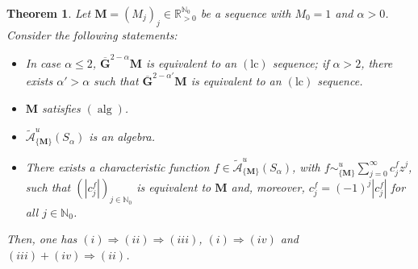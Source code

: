\documentclass[11pt,a4paper]{article}
\theoremstyle{plain}
\newtheorem{theorem}[proposition]{Theorem}
\theoremstyle{definition}
\newcommand{\RR}{\mathbb{R}}
\newcommand{\NN}{\mathbb{N}}
\newcommand{\M}{\mathbf{M}}
\newcommand{\G}{\mathbf{G}}
\let\on=\operatorname
\def\a{\alpha}
\begin{document}
\begin{theorem}\label{thm.stablepointwiseprop}
Let $\M=(M_j)_j\in\RR_{>0}^{\NN_0}$ be a sequence with $M_0=1$ and $\alpha>0$. Consider the following statements:
\begin{itemize}
    \item[(i)] In case $\alpha\leq 2$, $\overline{\G}^{2-\alpha}\M$ is equivalent to an \hyperlink{lc}{$(\text{lc})$} sequence; if $\alpha>2$, there exists $\a'>\a$ such that $\overline{\G}^{2-\alpha'}\M$ is equivalent to an \hyperlink{lc}{$(\text{lc})$} sequence.
\item[(ii)] $\M$ satisfies \hyperlink{s-alg}{$(\on{alg})$}.
\item[(iii)] $\mathcal{\widetilde{A}}^{u}_{\{\M\}}(S_{\a})$ is an algebra.
\item[(iv)] There exists a characteristic function $f\in \mathcal{\widetilde{A}}^{u}_{\{\M\}} (S_\alpha)$, with  $f\sim^u_{\{\M\}} \sum_{j=0}^\infty c^f_j z^j$, such that $(|c^f_j|)_{j\in\NN_0}$ is equivalent to $\M$ and, moreover,  $c^f_j=(-1)^j|c^f_j|$ for all $j\in\NN_0$.
\end{itemize} 
Then, one has $(i)\Rightarrow(ii)\Rightarrow(iii)$, $(i)\Rightarrow(iv)$ and $(iii)+(iv)\Rightarrow(ii)$. 
\end{theorem}
\end{document}
